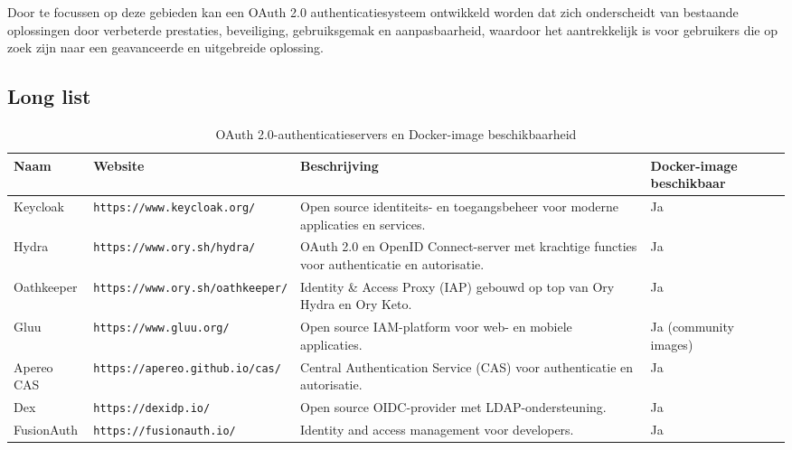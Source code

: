 Door te focussen op deze gebieden kan een OAuth 2.0 authenticatiesysteem ontwikkeld worden dat zich onderscheidt van bestaande oplossingen door verbeterde prestaties, beveiliging, gebruiksgemak en aanpasbaarheid, waardoor het aantrekkelijk is voor gebruikers die op zoek zijn naar een geavanceerde en uitgebreide oplossing.

\subsection{Long list}%
\label{subsec:long-list}
\begin{table}[htbp]
  \centering
  \caption{OAuth 2.0-authenticatieservers en Docker-image beschikbaarheid}
  \label{tab:oauth_servers}
  \begin{adjustbox}{width=1\textwidth}
  \begin{tabular}{@{}llll@{}}
    \toprule
    Naam          & Website                               & Beschrijving                                                                   & Docker-image beschikbaar \\ \midrule
    Keycloak      & \texttt{https://www.keycloak.org/}     & Open source identiteits- en toegangsbeheer voor moderne applicaties en services. & Ja                        \\
    Hydra         & \texttt{https://www.ory.sh/hydra/}     & OAuth 2.0 en OpenID Connect-server met krachtige functies voor authenticatie en autorisatie. & Ja                        \\
    Oathkeeper & \texttt{https://www.ory.sh/oathkeeper/} & Identity \& Access Proxy (IAP) gebouwd op top van Ory Hydra en Ory Keto. & Ja                        \\
    Gluu          & \texttt{https://www.gluu.org/}         & Open source IAM-platform voor web- en mobiele applicaties.                   & Ja (community images)    \\
    Apereo CAS    & \texttt{https://apereo.github.io/cas/} & Central Authentication Service (CAS) voor authenticatie en autorisatie.      & Ja                        \\
    Dex           & \texttt{https://dexidp.io/}            & Open source OIDC-provider met LDAP-ondersteuning.                             & Ja                        \\
    FusionAuth    & \texttt{https://fusionauth.io/}        & Identity and access management voor developers.                               & Ja                        \\

\end{tabular}
\end{adjustbox}
\end{table}
